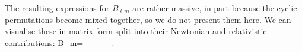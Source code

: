 The resulting expressions for $B_{\ell m}$ are rather massive, in part because the cyclic permutations become mixed together, so we do not present them here. We can visualise these in matrix form split into their Newtonian and relativistic contributions:
\be \label{eq:blm_newtrelmatrix}
B_{\ell m}=
 _
+
_\,.
